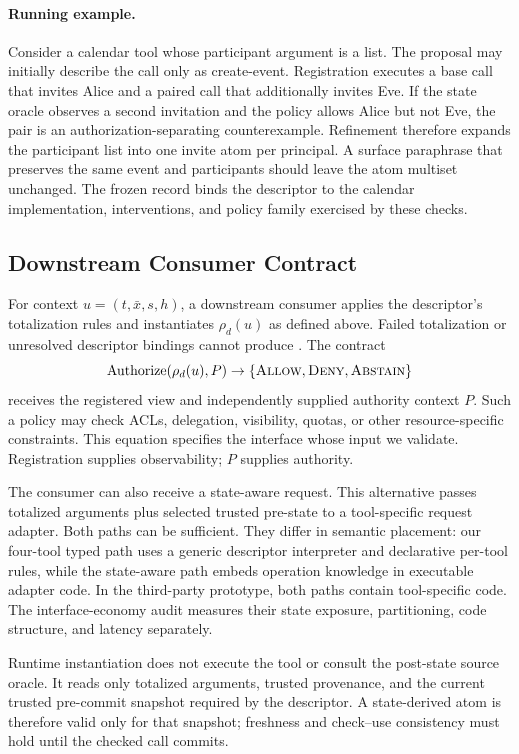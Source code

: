 \paragraph{Running example.}
Consider a calendar tool whose participant argument is a list.  The proposal
may initially describe the call only as \textsf{create-event}.  Registration
executes a base call that invites Alice and a paired call that additionally
invites Eve.  If the state oracle observes a second invitation and the policy
allows Alice but not Eve, the pair is an authorization-separating
counterexample.  Refinement therefore expands the participant list into one
\textsf{invite} atom per principal.  A surface paraphrase that preserves the
same event and participants should leave the atom multiset unchanged.  The
frozen record binds the descriptor to the calendar implementation,
interventions, and policy family exercised by these checks.

\subsection{Downstream Consumer Contract}

For context $u=(t,\bar{x},s,h)$, a downstream consumer applies the descriptor's
totalization rules and instantiates $\rho_d(u)$ as defined above.  Failed
totalization or unresolved descriptor bindings cannot produce \Allow{}.  The contract
\[
  \operatorname{Authorize}(\rho_d(u),P)
       \rightarrow \{\textnormal{\textsc{Allow}},\textnormal{\textsc{Deny}},\textnormal{\textsc{Abstain}}\}
\]
receives the registered view and independently supplied authority context $P$.  Such a
policy may check ACLs, delegation, visibility, quotas, or other
resource-specific constraints. This equation specifies the interface whose
input we validate. Registration supplies observability; $P$ supplies authority.

The consumer can also receive a state-aware request. This alternative passes
totalized arguments plus selected trusted pre-state to a tool-specific request
adapter. Both paths can be sufficient. They differ in semantic placement: our
four-tool typed path uses a generic descriptor interpreter and declarative
per-tool rules, while the state-aware path embeds operation knowledge in
executable adapter code. In the third-party prototype, both paths contain
tool-specific code. The interface-economy audit measures their state exposure,
partitioning, code structure, and latency separately.

Runtime instantiation does not execute the tool or consult the post-state source
oracle. It reads only totalized arguments, trusted provenance, and the current
trusted pre-commit snapshot required by the descriptor. A state-derived atom is
therefore valid only for that snapshot; freshness and check--use consistency
must hold until the checked call commits.

